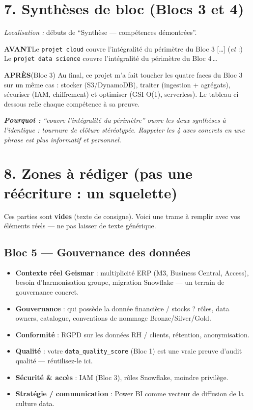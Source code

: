 \documentclass[11pt,a4paper]{article}
\newcommand{\av}{\textbf{\textcolor{avant}{AVANT}}\quad}
\newcommand{\ap}{\textbf{\textcolor{apres}{APRÈS}}\quad}
\newcommand{\pourquoi}[1]{\par\smallskip\noindent\textit{\textbf{Pourquoi :} #1}\par\smallskip}
\begin{document}
\section*{7. Synthèses de bloc (Blocs 3 et 4)}
\noindent\textit{Localisation :} débuts de \enquote{Synthèse --- compétences démontrées}.

\begin{avantbox}
\av Le \texttt{projet cloud} couvre l'intégralité du périmètre du Bloc 3 [\dots]
(\textit{et} :) Le \texttt{projet data science} couvre l'intégralité du périmètre du Bloc 4\,\dots
\end{avantbox}
\begin{apresbox}
\ap (Bloc 3) Au final, ce projet m'a fait toucher les quatre faces du Bloc 3 sur un même
cas : stocker (S3/DynamoDB), traiter (ingestion + agrégats), sécuriser (IAM, chiffrement)
et optimiser (GSI O(1), serverless). Le tableau ci-dessous relie chaque compétence à sa
preuve.
\end{apresbox}
\pourquoi{\enquote{couvre l'intégralité du périmètre} ouvre les deux synthèses à
l'identique : tournure de clôture stéréotypée. Rappeler les 4 axes concrets en une phrase
est plus informatif et personnel.}

\section*{8. Zones à rédiger (pas une réécriture : un squelette)}
Ces parties sont \textbf{vides} (texte de consigne). Voici une trame à remplir avec vos
éléments réels --- ne pas laisser de texte générique.

\subsection*{Bloc 5 --- Gouvernance des données}
\begin{itemize}[leftmargin=1.3em]
  \item \textbf{Contexte réel Geismar} : multiplicité ERP (M3, Business Central, Access),
  besoin d'harmonisation groupe, migration Snowflake --- un terrain de gouvernance concret.
  \item \textbf{Gouvernance} : qui possède la donnée financière / stocks ? rôles, data owners,
  catalogue, conventions de nommage Bronze/Silver/Gold.
  \item \textbf{Conformité} : RGPD sur les données RH / clients, rétention, anonymisation.
  \item \textbf{Qualité} : votre \texttt{data\_quality\_score} (Bloc 1) est une vraie preuve
  d'audit qualité --- réutilisez-le ici.
  \item \textbf{Sécurité \& accès} : IAM (Bloc 3), rôles Snowflake, moindre privilège.
  \item \textbf{Stratégie / communication} : Power BI comme vecteur de diffusion de la culture data.
\end{itemize}
\end{document}
